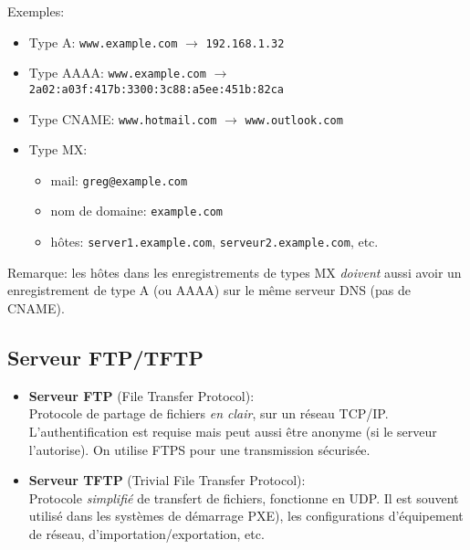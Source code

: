 \documentclass[class=article, crop=false]{standalone}
\begin{document}
Exemples:
\begin{itemize}
    \item Type A: \texttt{www.example.com} $ \rightarrow $ \texttt{192.168.1.32}
    \item Type AAAA: \texttt{www.example.com} $ \rightarrow $ \texttt{2a02:a03f:417b:3300:3c88:a5ee:451b:82ca}
    \item Type CNAME: \texttt{www.hotmail.com} $ \rightarrow $ \texttt{www.outlook.com}
    \item Type MX:
    \begin{itemize}
        \item mail: \texttt{greg@example.com}
        \item nom de domaine: \texttt{example.com}
        \item hôtes: \texttt{server1.example.com}, \texttt{serveur2.example.com}, etc.
    \end{itemize}
\end{itemize}

Remarque: les hôtes dans les enregistrements de types MX \textit{doivent} aussi avoir un enregistrement de type A (ou AAAA) sur le même serveur DNS (pas de CNAME).










\subsection{Serveur FTP/TFTP}

\begin{itemize}
\item \textbf{Serveur FTP} (File Transfer Protocol): \\
Protocole de partage de fichiers \textit{en clair}, sur un réseau TCP/IP. L'authentification est requise mais peut aussi être anonyme (si le serveur l'autorise). On utilise FTPS pour une transmission sécurisée.
\item \textbf{Serveur TFTP} (Trivial File Transfer Protocol): \\
Protocole \textit{simplifié} de transfert de fichiers, fonctionne en UDP. Il est souvent utilisé dans les systèmes de démarrage PXE), les configurations d'équipement de réseau, d'importation/exportation, etc.
\end{itemize}
\end{document}

